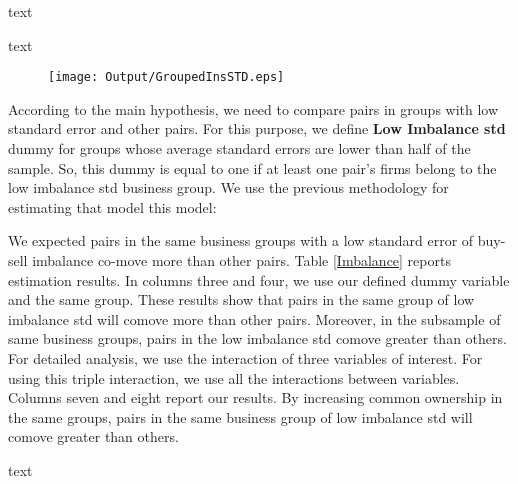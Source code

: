 	{\begin{table}[htbp]
		\centering
		\caption{text}
		\resizebox{0.75\textwidth}{!}{
			
		}
		\label{tab:ImbalanceInsMeanSummary}%
	\end{table}}
	{\begin{table}[htbp]
		\centering
		\caption{text}
		\resizebox{0.75\textwidth}{!}{
			
		}
		\label{tab:ImbalanceInsStdSummary}%
\end{table}}
	\begin{figure}[htbp]
		\centering
		\texttt{[image: Output/GroupedInsSTD.eps]}
		\label{fig:GroupedInsSTD}
	\end{figure}
	
	According to the main hypothesis, we need to compare pairs in groups with low standard error and other pairs.
	For this purpose, we define \textbf{Low Imbalance std} dummy for groups whose average standard errors are lower than half of the sample. 
	So, this dummy is equal to one if at least one pair's firms belong to the low imbalance std business group.  We use the previous methodology for estimating that model this model:
	
	
	We expected pairs in the same business groups with a low standard error of buy-sell imbalance co-move more than other pairs. Table \ref{Imbalance} reports estimation results. In columns three and four, we use our defined dummy variable and the same group. These results show that pairs in the same group of low imbalance std will comove more than other pairs. Moreover, in the subsample of same business groups, pairs in the low imbalance std comove greater than others.  For detailed analysis, we use the interaction of three variables of interest. For using this triple interaction, we use all the interactions between variables. Columns seven and eight report our results. By increasing common ownership in the same groups, pairs in the same business group of low imbalance std will comove greater than others.
	
		{\begin{table}[htbp]
			\centering
			\caption{text}
			\label{Imbalance}
			\resizebox{\textwidth}{!}{
				
			}
	\end{table}}

